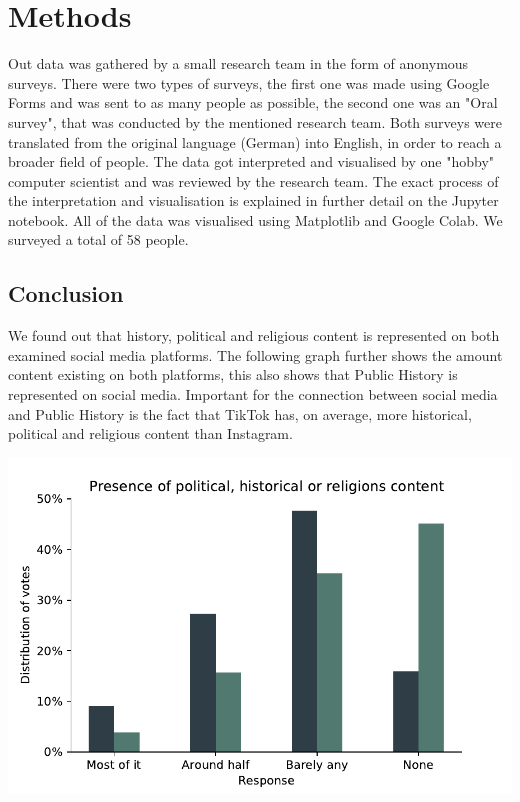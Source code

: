 \documentclass{article}
\begin{document}
\section{Methods}

Out data was gathered by a small research team in the form of anonymous surveys. There were two types of surveys, the first one was made using Google Forms and was sent to as many people as possible, the second one was an "Oral survey", that was conducted by the mentioned research team. Both surveys were translated from the original language (German) into English, in order to reach a broader field of people. The data got interpreted and visualised by one "hobby" computer scientist and was reviewed by the research team. The exact process of the interpretation and visualisation is explained in further detail on the Jupyter notebook. All of the data was visualised using Matplotlib and Google Colab. We surveyed a total of 58 people.

\subsection{Conclusion}

We found out that history, political and religious content is represented on both  
examined social media platforms. The following graph further shows the amount content existing on both platforms, this also shows that Public History is represented on social media. Important for the connection between social media and Public History is the fact that TikTok has, on average, more historical, political and religious content than Instagram. 

\begin{center}

\includegraphics[scale = 0.65]{PresenceOfPHR.pdf}

\end{center}
\end{document}

